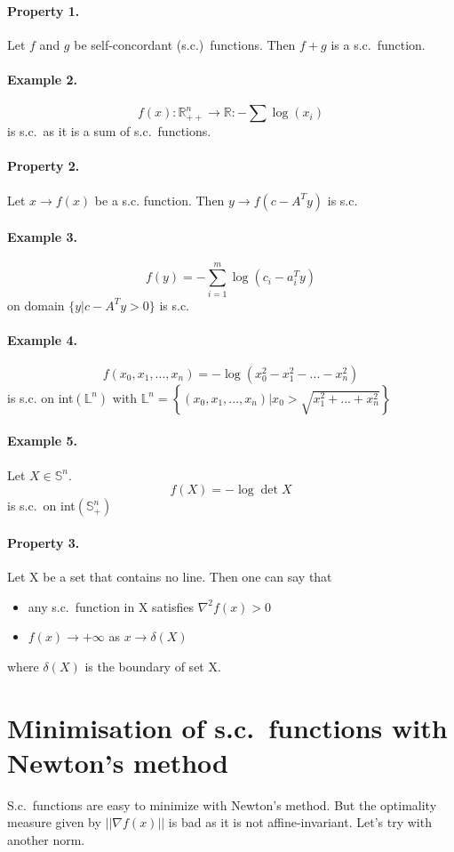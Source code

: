 \documentclass[a4paper,11pt]{article}
\begin{document}
\paragraph{Property 1.} Let $f$ and $g$ be self-concordant (s.c.)\ functions. Then $f+g$ is a s.c.\ function.
\paragraph{Example 2.}$$f(x) : \mathbb{R}_{++}^n \rightarrow \mathbb{R} : -\sum \log{(x_i)}$$ is s.c.\ as it is a sum of s.c.\ functions.

\paragraph{Property 2.} Let $x \rightarrow f(x)$ be a s.c. function. Then $y \rightarrow f(c-A^Ty)$ is s.c.\
\paragraph{Example 3.}
$$f(y) = - \sum\limits_{i=1}^m \log{(c_i-a_i^Ty)}$$ on domain $\{y|c-A^Ty > 0\}$ is s.c.\
\paragraph{Example 4.}
$$f(x_0,x_1,...,x_n) = -\log{(x_0^2-x_1^2-...-x_n^2)}$$ is s.c. on int$(\mathbb{L}^n)$ with $\mathbb{L}^n = \left\{(x_0,x_1,...,x_n) | x_0 > \sqrt{x_1^2+...+x_n^2}\right\}$
\paragraph{Example 5.} Let $X \in \mathbb{S}^n$.
$$f(X) = -\log{\det{X}}$$
is s.c.\ on int$(\mathbb{S}_+^n)$

\paragraph{Property 3.} Let X be a set that contains no line. Then one can say that
\begin{itemize}
\item any s.c.\ function in X satisfies $\nabla^2 f(x) > 0$
\item $f(x) \rightarrow + \infty$ as $x \rightarrow \delta(X)$
\end{itemize}
where $\delta(X)$ is the boundary of set X.


\section{Minimisation of s.c.\ functions with Newton's method}
S.c.\ functions are easy to minimize with Newton's method. But the optimality measure given by $\left|| \nabla f(x) \right||$ is bad as it is not affine-invariant. Let's try with another norm.
\end{document}
